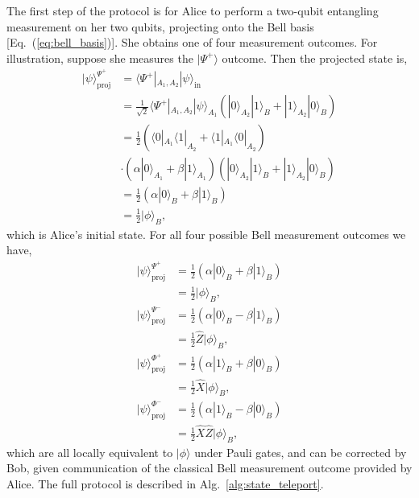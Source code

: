 \documentclass[aps,rmp,twocolumn,amsmath,amssymb,nofootinbib,superscriptaddress,longbibliography,floatfix,table-of-contents,eqsecnum]{revtex4-1}
\newcommand{\bra}[1]{\langle#1|}
\newcommand{\ket}[1]{|#1\rangle}
\begin{document}
The first step of the protocol is for Alice to perform a two-qubit entangling measurement on her two qubits, projecting onto the Bell basis [Eq.~(\ref{eq:bell_basis})]. She obtains one of four measurement outcomes. For illustration, suppose she measures the $\ket{\Psi^+}$ outcome. Then the projected state is,
\begin{align}
\ket\psi_\text{proj}^{\Psi^+} &= \bra{\Psi^+}_{A_1,A_2} \ket\psi_\text{in} \nonumber \\
&= \frac{1}{\sqrt{2}} \bra{\Psi^+}_{A_1,A_2}\ket\psi_{A_1}(\ket{0}_{A_2}\ket{1}_B + \ket{1}_{A_2}\ket{0}_B) \nonumber \\
&= \frac{1}{2} (\bra{0}_{A_1}\bra{1}_{A_2} + \bra{1}_{A_1}\bra{0}_{A_2}) \nonumber \\
&\cdot (\alpha\ket{0}_{A_1}+\beta\ket{1}_{A_1})(\ket{0}_{A_2}\ket{1}_B + \ket{1}_{A_2}\ket{0}_B) \nonumber \\
&= \frac{1}{2} (\alpha \ket{0}_B + \beta \ket{1}_B)\nonumber \\
&= \frac{1}{2} \ket\phi_B,
\end{align}
which is Alice's initial state. For all four possible Bell measurement outcomes we have,
\begin{align}
\ket\psi_\text{proj}^{\Psi^+} &= \frac{1}{2} (\alpha \ket{0}_B + \beta \ket{1}_B) \nonumber \\
&= \frac{1}{2} \ket\phi_B, \nonumber \\
\ket\psi_\text{proj}^{\Psi^-} &= \frac{1}{2} (\alpha \ket{0}_B - \beta \ket{1}_B) \nonumber \\
&= \frac{1}{2} \hat{Z}\ket\phi_B, \nonumber \\
\ket\psi_\text{proj}^{\Phi^+} &= \frac{1}{2} (\alpha \ket{1}_B + \beta \ket{0}_B) \nonumber \\
&= \frac{1}{2} \hat{X} \ket\phi_B, \nonumber \\
\ket\psi_\text{proj}^{\Phi^-} &= \frac{1}{2} (\alpha \ket{1}_B - \beta \ket{0}_B) \nonumber \\
&= \frac{1}{2} \hat{X}\hat{Z}\ket\phi_B,
\end{align}
which are all locally equivalent to $\ket\phi$ under Pauli gates, and can be corrected by Bob, given communication of the classical Bell measurement outcome provided by Alice. The full protocol is described in Alg.~\ref{alg:state_teleport}.
\end{document}
